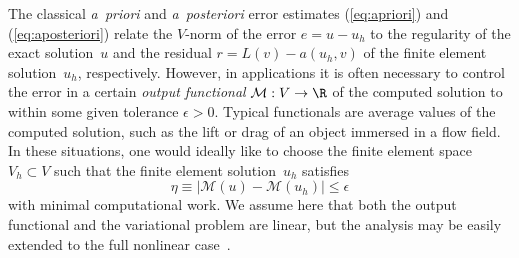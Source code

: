 The classical \emph{a~priori} and \emph{a~posteriori} error estimates
(\ref{eq:apriori}) and (\ref{eq:aposteriori}) relate the $V$-norm of
the error $e = u - u_h$ to the regularity of the exact solution~$u$
and the residual $r = L(v) - a(u_h, v)$ of the finite element
solution~$u_h$, respectively. However, in applications it is often
necessary to control the error in a certain \emph{output functional}
$\mathcal{M} : V \rightarrow \R$ of the computed solution to within
some given tolerance $\epsilon > 0$. Typical functionals are average
values of the computed solution, such as the lift or drag of an object
immersed in a flow field. In these situations, one would ideally like
to choose the finite element space $V_h \subset V$ such that the
finite element solution~$u_h$ satisfies
\begin{equation}
  \eta \equiv |\mathcal{M}(u) - \mathcal{M}(u_h)| \leqslant \epsilon
\end{equation}
with minimal computational work. We assume here that both the output
functional and the variational problem are linear, but the analysis
may be easily extended to the full nonlinear
case~\citep{ErikssonEstepHansboEtAl1995,BeckerRannacher2001}.

